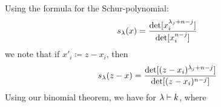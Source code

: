 \documentclass[notitlepage, 10pt]{article}
\begin{document}
    Using the formula for the Schur-polynomial:
    \begin{equation}
        s_{\lambda}(x) = \frac{\det[x_i^{\lambda_j+n-j}]}{\det[x_i^{n-j}]}
    \end{equation}
    we note that if $x'_i \coloneqq z - x_i$, then
    \begin{equation}
        s_{\lambda}(z-x) = \frac{\det[(z - x_i)^{\lambda_j+n-j}]}{\det[(z - x_i)^{n-j}]}
    \end{equation}
    Using our binomial theorem, we have for $\lambda \vdash k$, where
\end{document}
